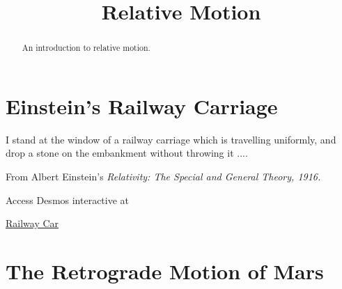 \documentclass{ximera}
\title{Relative Motion}
\begin{document}
\begin{abstract}
An introduction to relative motion.
\end{abstract}
\maketitle

\section{Einstein's Railway Carriage}

I stand at the window of a railway carriage which is travelling uniformly, and drop a stone on the embankment without throwing it ....

From Albert Einstein's \it{Relativity: The Special and General Theory}, 1916.


\begin{exploration} \label{Edsss4tDE}

Access Desmos interactive at
 
\href{https://www.desmos.com/calculator/vyxsrjx0kp}{Railway Car}

 
\begin{onlineOnly}
    \begin{center}
\end{center}
\end{onlineOnly}


\end{exploration}



\section{The Retrograde Motion of Mars}
\end{document}
